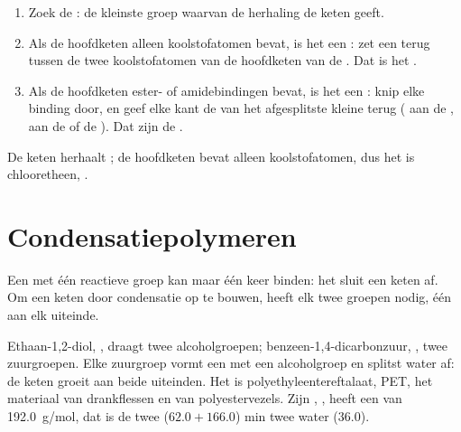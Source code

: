 \begin{method}\label{met:g12:polymers:monomer}
\begin{enumerate}
  \item Zoek de : de kleinste groep waarvan de
        herhaling de keten geeft.
  \item Als de hoofdketen alleen koolstofatomen bevat, is het een
        : zet een  terug tussen de twee
        koolstofatomen van de hoofdketen van de . Dat
        is het .
  \item Als de hoofdketen ester- of amidebindingen bevat, is het een
        : knip elke binding door, en geef elke kant de
         van het afgesplitste kleine  terug ( aan de
        ,  aan de  of de ). Dat zijn de
        .
\end{enumerate}
\end{method}

\begin{example}\label{ex:g12:polymers:pvc}
De keten  herhaalt ; de
hoofdketen bevat alleen koolstofatomen, dus het  is
chloor\-etheen, .
\end{example}

\section{Condensatiepolymeren}

Een  met één reactieve groep kan maar één keer binden: het sluit
een keten af. Om een keten door condensatie op te bouwen, heeft elk
 twee groepen nodig, één aan elk uiteinde.

\begin{example}\label{ex:g12:polymers:pet}
Ethaan-1,2-diol, , draagt twee alcoholgroepen;
benzeen-1,4-dicarbonzuur, , twee zuurgroepen. Elke
zuurgroep vormt een  met een alcoholgroep en splitst water af: de
keten groeit aan beide uiteinden. Het  is
polyethyleentereftalaat, PET, het materiaal van drankflessen en van
polyestervezels. Zijn , , heeft een  van \qty{192.0}{g/mol}, dat is de twee 
($62.0 + 166.0$) min twee  water ($36.0$).
\end{example}


